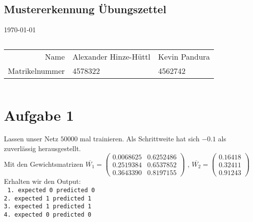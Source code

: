 \documentclass[a4paper,10pt]{article}
\begin{document}
\begin{center}
    \section*{Mustererkennung Übungszettel}
     \today
\end{center}
$ $
\newline
\begin{tabular}{r|l l}
    Name & Alexander Hinze-Hüttl & Kevin Pandura\\
    Matrikelnummer & 4578322 & 4562742\\
\end{tabular}
\newline
$ $
\newline
\newline

\section*{Aufgabe 1}

Lassen unser Netz $50000$ mal trainieren. Als Schrittweite hat sich $-0.1$ als zuverlässig herausgestellt.\\


Mit den Gewichtsmatrizen $\overline{W_1} =    \left(\begin{matrix}
0.0068625 & 0.6252486\\
0.2519384 & 0.6537852\\
0.3643390 & 0.8197155
\end{matrix} \right)$ , $\overline{W_2} =    \left(\begin{matrix}
0.16418\\
0.32411\\
0.91243
\end{matrix} \right)$ 
Erhalten wir den Output:\\
\texttt{
1. expected 0      predicted 0\\
2. expected 1      predicted 1\\
3. expected 1      predicted 1\\
4. expected 0      predicted 0
}
\\
\end{document}
